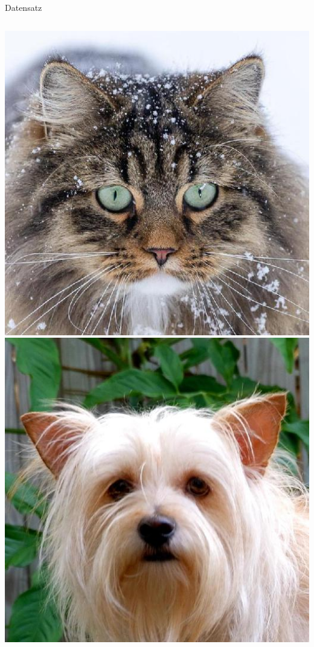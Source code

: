 \documentclass[aspectratio=1610, 9pt]{beamer}
\begin{document}
\begin{frame}{Datensatz}
\begin{columns}
    \includegraphics[scale=0.13]{images/cat.jpg}\\
    \includegraphics[scale=0.13]{images/dog.jpg}\\

\end{columns}
\end{frame}
\end{document}
